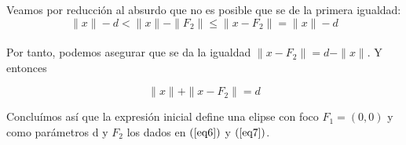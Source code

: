 \documentclass[12pt]{article}
\begin{document}
Veamos por reducción al absurdo que no es posible que se de la primera igualdad:\\

$$
\|x\| - d < \|x\| - \|F_2\| \leq \|x - F_2\| = \|x\| - d
$$\\


Por tanto, podemos asegurar que se da la igualdad $\|x - F_2\|   = d - \|x\|$. Y entonces

$$ \|x\| + \|x - F_2\|   = d $$

Concluímos así que la expresión inicial define una elipse con foco $F_1 = (0,0)$ y como parámetros d y $F_2$ los dados en $(\ref{eq6})$ y $(\ref{eq7})$.
\end{document}
